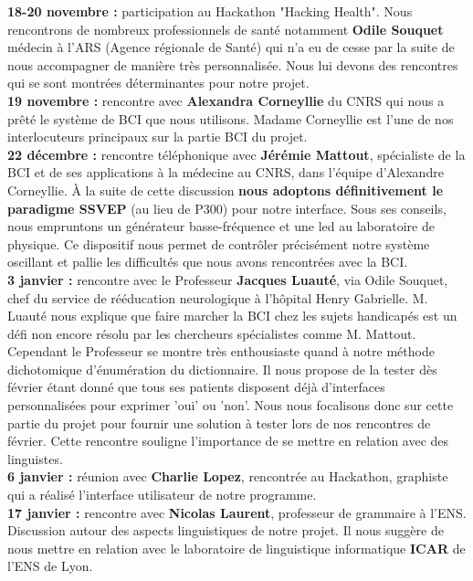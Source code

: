 \documentclass[11pt,a4paper]{article}
\theoremstyle{plain}
\theoremstyle{definition}
\begin{document}
\textbf{18-20 novembre : } participation au Hackathon "Hacking Health". Nous rencontrons de nombreux professionnels de santé notamment \textbf{Odile Souquet} médecin à l'ARS (Agence régionale de Santé) qui n'a eu de cesse par la suite de nous accompagner de manière très personnalisée. Nous lui devons des rencontres qui se sont montrées déterminantes pour notre projet. \\

\textbf{19 novembre : } rencontre avec \textbf{Alexandra Corneyllie} du CNRS qui nous a prêté le système de BCI que nous utilisons. Madame Corneyllie est l'une de nos interlocuteurs principaux sur la partie BCI du projet. \\

\textbf{22 décembre : } rencontre téléphonique avec \textbf{Jérémie Mattout}, spécialiste de la BCI et de ses applications à la médecine au CNRS, dans l'équipe d'Alexandre Corneyllie. À la suite de cette discussion \textbf{nous adoptons définitivement le paradigme SSVEP} (au lieu de P300) pour notre interface. Sous ses conseils, nous empruntons un générateur basse-fréquence et une led au laboratoire de physique. Ce dispositif nous permet de contrôler précisément notre système oscillant et pallie les difficultés que nous avons rencontrées avec la BCI. \\

\textbf{3 janvier : } rencontre avec le Professeur \textbf{Jacques Luauté}, via Odile Souquet, chef du service de rééducation neurologique à l'hôpital Henry Gabrielle. M. Luauté nous explique que faire marcher la BCI chez les sujets handicapés est un défi non encore résolu par les chercheurs spécialistes comme M. Mattout. Cependant le Professeur se montre très enthousiaste quand à notre méthode dichotomique d'énumération du dictionnaire. Il nous propose de la tester dès février étant donné que tous ses patients disposent déjà d'interfaces personnalisées pour exprimer 'oui' ou 'non'. Nous nous focalisons donc sur cette partie du projet pour fournir une solution à tester lors de nos rencontres de février. Cette rencontre souligne l'importance de se mettre en relation avec des linguistes. \\

\textbf{6 janvier : } réunion avec \textbf{Charlie Lopez}, rencontrée au Hackathon, graphiste qui a réalisé l'interface utilisateur de notre programme. \\

\textbf{17 janvier : } rencontre avec \textbf{Nicolas Laurent}, professeur de grammaire à l'ENS. Discussion autour des aspects linguistiques de notre projet. Il nous suggère de nous mettre en relation avec le laboratoire de linguistique informatique \textbf{ICAR} de l'ENS de Lyon. \\
\end{document}
